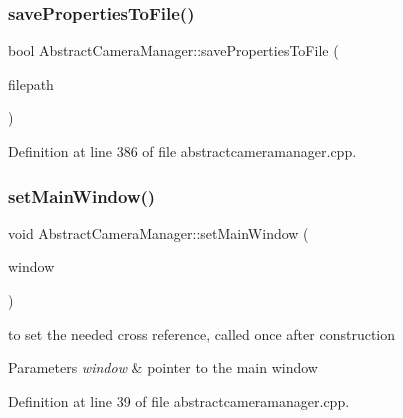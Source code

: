 \mbox{\label{class_abstract_camera_manager_a2a649f85fb8bfd333379204af3399e5a}} 
\subsubsection{\texorpdfstring{savePropertiesToFile()}{savePropertiesToFile()}}
{\footnotesize\ttfamily bool Abstract\+Camera\+Manager\+::save\+Properties\+To\+File (\begin{DoxyParamCaption}\item[{Q\+String \&}]{filepath }\end{DoxyParamCaption})}



Definition at line 386 of file abstractcameramanager.\+cpp.

\mbox{\label{class_abstract_camera_manager_a9369df77518a91e24596d2bbe3436bab}} 
\subsubsection{\texorpdfstring{setMainWindow()}{setMainWindow()}}
{\footnotesize\ttfamily void Abstract\+Camera\+Manager\+::set\+Main\+Window (\begin{DoxyParamCaption}\item[{\mbox{\hyperlink{class_main_window}{Main\+Window}} $\ast$}]{window }\end{DoxyParamCaption})}



to set the needed cross reference, called once after construction 


\begin{DoxyParams}{Parameters}
{\em window} & pointer to the main window \\
\hline
\end{DoxyParams}


Definition at line 39 of file abstractcameramanager.\+cpp.

\mbox{\label{class_abstract_camera_manager_ac5c7ff3b69138df82efafa0400b50ce5}} 
